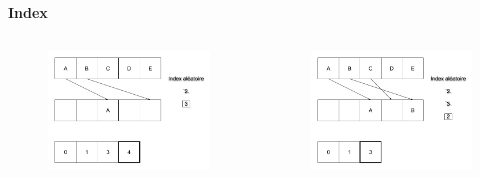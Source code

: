 \documentclass{beamer}
\begin{document}
\begin{frame}[t]
\begin{columns}[t]
\begin{column}{.5\linewidth}
\begin{block}{\centering \textbf{Index}}
\begin{columns}[t]
                        \begin{column}{.3\linewidth}
                            \begin{figure}[t]
                                \includegraphics[width=\linewidth]{rsc/index1_2.png}
                            \end{figure}
                        \end{column}

                        \begin{column}{.3\linewidth}
                            \begin{figure}[t]
                                \includegraphics[width=\linewidth]{rsc/index1_3.png}
                            \end{figure}
                        \end{column}
                    \end{columns}
                \end{block}


\end{column}
\end{columns}
\end{frame}
\end{document}
